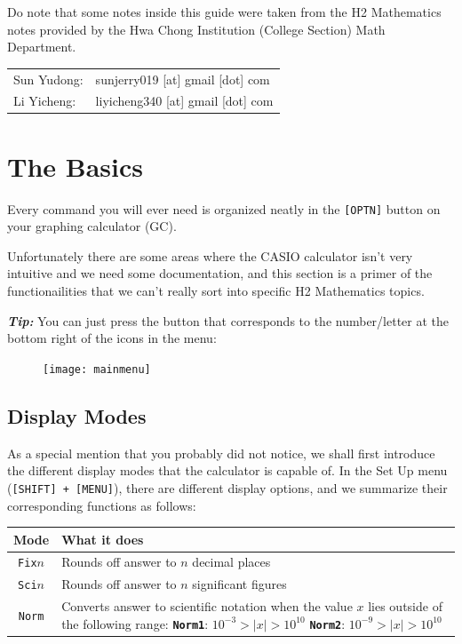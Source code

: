 \documentclass[a5paper]{memoir}
\def\code#1{\texttt{#1}}
\def\tip#1{\textcolor[HTML]{a9109f}{\textbf{\textit{Tip:}}} #1}
\begin{document}
Do note that some notes inside this guide were taken from the H2 Mathematics notes provided by the Hwa Chong Institution (College Section) Math Department. 

\vspace{0.7cm}

\begin{tabular}{l l}
	Sun Yudong: & sunjerry019 [at] gmail [dot] com \\
	Li Yicheng: & liyicheng340 [at] gmail [dot] com 
\end{tabular}


\mainmatter
\chapter{The Basics}
Every command you will ever need is organized neatly in the \code{[OPTN]} button on your graphing calculator (GC).

Unfortunately there are some areas where the CASIO calculator isn't very intuitive and we need some documentation, and this section is a primer of the functionailities that we can't really sort into specific H2 Mathematics topics.

\tip{You can just press the button that corresponds to the number/letter at the bottom right of the icons in the menu:}

\begin{figure}[h]
	\centering
	\texttt{[image: mainmenu]}
\end{figure}

\section{Display Modes}
As a special mention that you probably did not notice, we shall first introduce the different display modes that the calculator is capable of. In the Set Up menu (\code{[SHIFT] + [MENU]}), there are different display options, and we summarize their corresponding functions as follows:
\begin{center}
	\renewcommand{\arraystretch}{1.3}
	\begin{tabular}{|c|p{7.5cm}|}
		\hline
		\textbf{Mode}	&	\textbf{What it does} \\
		\hline
		\code{Fix}$n$	&	Rounds off answer to $n$ decimal places \\
		\hline
		\code{Sci}$n$	&	Rounds off answer to $n$ significant figures \\
		\hline
		\code{Norm}		&	Converts answer to scientific notation when the value $x$ lies outside of the following range: \vspace{2mm} \newline \hspace*{5mm} \textbf{\code{Norm1}}: $10^{-3}>|x|>10^{10}$ \newline \hspace*{5mm} \textbf{\code{Norm2}}: $10^{-9}>|x|>10^{10}$ \\
		\hline
	\end{tabular}
\end{center}
\end{document}
